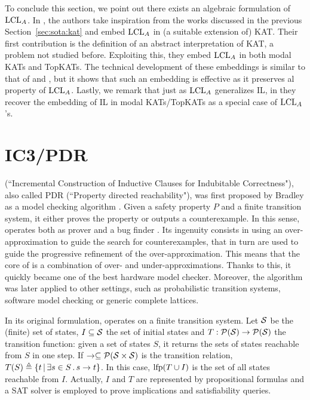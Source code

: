 To conclude this section, we point out there exists an algebraic formulation of $\text{LCL}_A$. In \cite{MR22}, the authors take inspiration from the works discussed in the previous Section~\ref{sec:sota:kat} and embed $\text{LCL}_A$ in (a suitable extension of) KAT. Their first contribution is the definition of an abstract interpretation of KAT, a problem not studied before. Exploiting this, they embed $\text{LCL}_A$ in both modal KATs and TopKATs. The technical development of these embeddings is similar to that of \cite{MOH21} and \cite{ZAG22}, but it shows that such an embedding is effective as it preserves al property of $\text{LCL}_A$. Lastly, we remark that just as $\text{LCL}_A$ generalizes IL, in \cite{MR22} they recover the embedding of IL in modal KATs/TopKATs as a special case of $\text{LCL}_A$'s.

\section{IC3/PDR}\label{sec:sota:pdr}
 (``Incremental Construction of Inductive Clauses for Indubitable Correctness"), also called PDR (``Property directed reachability"), was first proposed by Bradley as a model checking algorithm \cite{Bradley11}. Given a safety property $P$ and a finite transition system, it either proves the property or outputs a counterexample. In this sense,  operates both as prover and a bug finder \cite{Bradley12}. Its ingenuity consists in using an over-approximation to guide the search for counterexamples, that in turn are used to guide the progressive refinement of the over-approximation. This means that the core of  is a combination of over- and under-approximations.
Thanks to this, it quickly became one of the best hardware model checker. Moreover, the algorithm was later applied to other settings, such as probabilistic transition systems, software model checking or generic complete lattices.

In its original formulation,  operates on a finite transition system. Let $\mathcal{S}$ be the (finite) set of states, $I \subseteq \mathcal{S}$ the set of initial states and $T : \mathcal{P}(\mathcal{S}) \rightarrow \mathcal{P}(\mathcal{S})$ the transition function: given a set of states $S$, it returns the sets of states reachable from $S$ in one step. If $\rightarrow \subseteq \mathcal{P}(\mathcal{S} \times \mathcal{S})$ is the transition relation, $T(S) \triangleq \{ t \,\vert\, \exists s \in S \,.\, s \rightarrow t \}$. In this case, $\text{lfp}(T \cup I)$ is the set of all states reachable from $I$.
Actually, $I$ and $T$ are represented by propositional formulas and a SAT solver is employed to prove implications and satisfiability queries.

